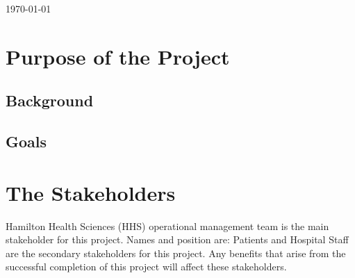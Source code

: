 \documentclass[paper=letter, fontsize=10pt]{scrartcl}
\numberwithin{equation}{section}		%
\numberwithin{figure}{section}			%
\numberwithin{table}{section}				%
\begin{document}
\begin{titlepage}
\begin{center}


{\large \today}\\[3cm] %


 

\vfill %
\end{center}
\end{titlepage}

\setcounter{tocdepth}{2}

\tableofcontents

\newpage

\section{Purpose of the Project}

\subsection{Background}

\subsection{Goals}

\section{The Stakeholders}
Hamilton Health Sciences (HHS) operational management team is the main stakeholder for this project. Names and position are:
Patients and Hospital Staff are the secondary stakeholders for this project. Any benefits that arise from the successful completion of this project will affect these stakeholders. 
\end{document}
